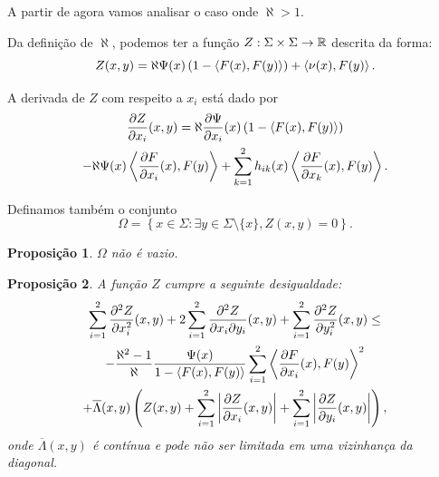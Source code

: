 \documentclass[12pt,a4paper]{beamer}
\newtheorem{proposicao}{Proposição}
\theoremstyle{definition}
\begin{document}
\begin{frame}

		A partir de agora vamos analisar o caso onde $\aleph > 1$.
	
	
	Da definição de $\aleph$, podemos ter a função $Z: \Sigma \times \Sigma \rightarrow \mathbb R$ descrita da forma:
	\begin{equation*}
		Z(x,y) = \aleph \Psi(x) \left(1 - \left\langle F(x),F(y) \right\rangle \right) + \left\langle \nu(x),F(y) \right\rangle.
	\end{equation*}
	
	A derivada de $Z$ com respeito a $x_i$ está dado por
	\begin{multline*}
		\frac{\partial Z}{\partial x_i}(x,y) = \aleph \frac{\partial \Psi}{\partial x_i}(x) \left( 1 - \left\langle F(x),F(y) \right\rangle \right) \\
		-\aleph \Psi(x) \left\langle \frac{\partial F}{\partial x_i}(x),F(y) \right\rangle + \sum_{k=1}^{2} h_{ik}(x) \left\langle \frac{\partial F}{\partial x_k}(x),F(y) \right\rangle.
	\end{multline*}
	

\end{frame}



\begin{frame}
		Definamos também o conjunto
	\begin{equation*}
	\Omega = \left\{ x \in \Sigma: \exists y \in \Sigma \setminus \{ x \}, Z(x,y)=0 \right\}.
	\end{equation*}
	
	\begin{proposicao}
		$\Omega$ não é vazio.
	\end{proposicao}
\end{frame}

\begin{frame}
	\begin{proposicao}\label{sum-2nd-derivative-z-inequality}
		A função $Z$ cumpre a seguinte desigualdade:
		\begin{multline*}
			\sum_{i=1}^{2} \frac{\partial^2 Z}{\partial x_i^2}(x,y) + 2 \sum_{i=1}^{2} \frac{\partial^2 Z}{\partial x_i \partial y_i}(x,y) + \sum_{i=1}^{2} \frac{\partial^2 Z}{\partial y_i^2}(x,y) \leq \\
			- \frac{\aleph^2 -1}{\aleph} \frac{\Psi(x)}{1 - \left\langle F(x),F(y) \right\rangle} \sum_{i=1}^{2} \left\langle \frac{\partial F}{\partial x_i}(x),F(y) \right\rangle^2 \\ 
			+ \overline{\Lambda}(x,y) \left( Z(x,y) + \sum_{i=1}^{2} \left| \frac{\partial Z}{\partial x_i}(x,y) \right| + \sum_{i=1}^{2} \left| \frac{\partial Z}{\partial y_i}(x,y) \right| \right),
		\end{multline*}
		onde $\overline{\Lambda}(x,y)$ é contínua e pode não ser limitada em uma vizinhança da diagonal.
	\end{proposicao}
\end{frame}
\end{document}
